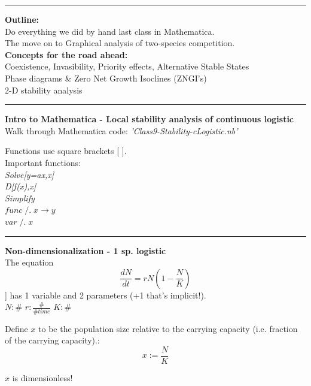 \documentclass{article}
\newcommand{\note}[1]{\colorbox{gray!30}{#1}}
\newcommand{\ind}{\-\hspace{1cm}}
\begin{document}
\noindent{}

\rule[0.5ex]{\linewidth}{1pt}
\textbf{Outline:}\\
\ind Do everything we did by hand last class in Mathematica.\\
\ind The move on to Graphical analysis of two-species competition.\\
\textbf{Concepts for the road ahead:}\\
\ind Coexistence, Invasibility, Priority effects, Alternative Stable States\\
\ind Phase diagrams \& Zero Net Growth Isoclines (ZNGI's) \\
\ind 2-D stability analysis

\rule[0.5ex]{\linewidth}{1pt}

\textbf{Intro to Mathematica - Local stability analysis of continuous logistic}\\
\note{Walk through Mathematica code: \emph{'Class9-Stability-cLogistic.nb'}}

Functions use square brackets [ ].\\
Important functions:\\
\ind \emph{Solve[y=ax,x]}\\
\ind \emph{D[f(x),x]}\\
\ind \emph{Simplify}\\
\ind $func\; /. \; x \to y$\\ 
\ind $var\; /. \; x$

\rule[0.5ex]{\linewidth}{1pt}

\textbf{Non-dimensionalization - 1 sp. logistic}\\
The equation
\begin{equation*}
	\frac{dN}{dt}=rN\left(1-\frac{N}{K}\right)
\end{equation*}]
has  1 variable and 2 parameters (+1 that's implicit!).\\
\ind \ind $N : \#$
\ind \ind $r : \frac{\#}{\# time}$
\ind \ind $K : \#$

\vspace{0.5cm}

Define $x$ to be the population size relative to the carrying capacity (i.e. fraction of the carrying capacity).:
\begin{equation*}
	x := \frac{N}{K}
\end{equation*}

$x$ is dimensionless!

\vspace{0.5cm}
\end{document}
